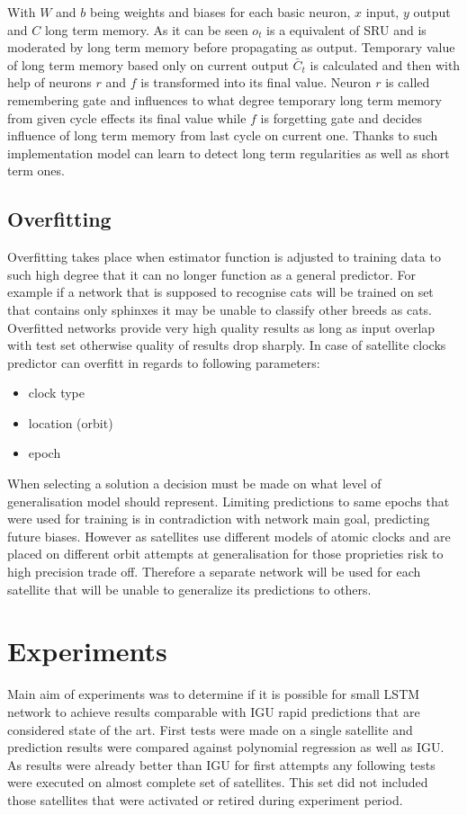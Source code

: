 \documentclass{kybernetika}
\begin{document}
With $W$ and $b$ being weights and biases for each basic neuron, $x$ input, $y$ output and
$C$ long term memory. As it can be seen $o_t$ is a equivalent of SRU and is moderated by
long term memory before propagating as output. Temporary value of long term memory based
only on current output $\bar{C}_t$ is calculated and then with help of neurons $r$ and $f$
is transformed into its final value.
Neuron $r$ is called remembering gate and influences to what degree temporary long term
memory from given cycle effects its final value while $f$ is forgetting gate and
decides influence of long term memory from last cycle on current one.
Thanks to such implementation model can learn to detect long term regularities as well
as short term ones.

\subsection{Overfitting}  
Overfitting takes place when estimator function is adjusted to training data to such high
degree that it can no longer function as a general predictor.
For example if a network that is supposed to recognise cats will be trained on set that contains
only sphinxes it may be unable to classify other breeds as cats.
Overfitted networks provide very high quality results as long as input overlap with test set
otherwise quality of results drop sharply.
In case of satellite clocks predictor can overfitt in regards to following parameters:
\begin{itemize}
\item clock type
\item location (orbit)
\item epoch
\end{itemize}
When selecting a solution a decision must be made on what level of generalisation model should
represent. Limiting predictions to same epochs that were used for training is in contradiction
with network main goal, predicting future biases. However as satellites use different models
of atomic clocks and are placed on different orbit attempts at generalisation for those
proprieties risk to high precision trade off.
Therefore a separate network will be used for each satellite that will be unable to generalize
its predictions to others.

\section{Experiments}
Main aim of experiments was to determine if it is possible for small LSTM network to 
achieve results comparable with IGU rapid predictions that are considered state of the art.
First tests were made on a single satellite and prediction results were compared against 
polynomial regression as well as IGU. As results were already better than IGU for first attempts
any following tests were executed on almost complete set of satellites. This set did not included
those satellites that were activated or retired during experiment period.
\end{document}
